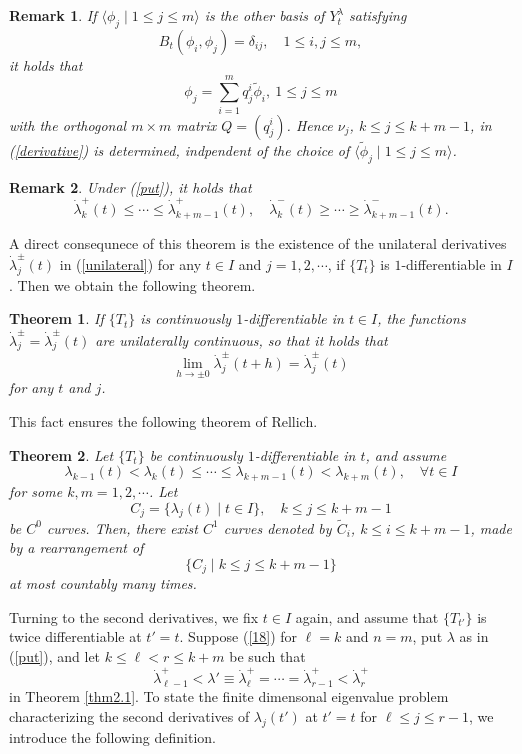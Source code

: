 \documentclass[final,a4paper]{jmsj}
\theoremstyle{thmstyleone}%
\newtheorem{theorem}{Theorem}
\theoremstyle{thmstyletwo}%
\newtheorem{remark}{Remark}%
\theoremstyle{thmstylethree}%
\begin{document}
\begin{remark}\label{orthgonalt}
If $\langle \phi_j \mid 1\leq j\leq m\rangle$ is the other basis of $Y^\lambda_t$ satisfying 
\begin{equation}  
B_t(\phi_i, \phi_j)=\delta_{ij}, \quad 1\leq i, j\leq m, 
 \label{xx1}
\end{equation} 
it holds that 
\[ \phi_j=\sum_{i=1}^mq^i_j\tilde \phi_i, \ 1\leq j\leq m \] 
with the orthogonal $m\times m$ matrix $Q=(q^i_j)$. Hence $\nu_j$, $k\leq j\leq k+m-1$, in (\ref{derivative}) is determined, indpendent of the choice of $\langle \tilde \phi_j \mid 1\leq j\leq m\rangle$.  
\end{remark} 

\begin{remark} 
Under (\ref{put}), it holds that 
\[ \dot \lambda_k^+(t)\leq \cdots \leq \dot \lambda_{k+m-1}^+(t), \quad \dot \lambda_k^-(t)\geq \cdots \geq \dot \lambda_{k+m-1}^-(t). \] 
\end{remark} 

A direct consequnece of this theorem is the existence of the unilateral derivatives 
$\dot\lambda_j^\pm(t)$ in (\ref{unilateral}) for any $t\in I$ and $j=1,2,\cdots$, if $\{ T_t\}$ is $1$-differentiable in $I$. Then we obtain the following theorem. 

\begin{theorem}\label{thm2+}
If $\{ T_t\}$ is continuously $1$-differentiable in $t\in I$, the functions $\dot\lambda^\pm_j=\dot\lambda^\pm_j(t)$ are unilaterally continuous, so that it holds that 
\[ \lim_{h\rightarrow \pm 0}\dot \lambda_j^\pm(t+h)=\dot \lambda_j^\pm(t) \] 
for any $t$ and $j$.  
\end{theorem} 

This fact ensures the following theorem of Rellich. 

\begin{theorem}\label{rellich+} 
Let $\{ T_t\}$ be continuously $1$-differentiable in $t$, and assume 
\[ \lambda_{k-1}(t)<\lambda_k(t)\leq \cdots \leq \lambda_{k+m-1}(t)<\lambda_{k+m}(t), \quad \forall t\in I  \] 
for some $k,m=1,2,\cdots$. Let 
\[ C_j=\{ \lambda_j(t) \mid t\in I\}, \quad k\leq j\leq k+m-1 \] 
be $C^0$ curves. Then, there exist $C^1$ curves denoted by $\tilde C_i$, $k\leq i\leq k+m-1$, made by a rearrangement of 
\[ \{ C_j\mid k\leq j\leq k+m-1\} \] 
at most countably many times.  
\end{theorem} 

Turning to the second derivatives, we fix $t\in I$ again, and assume that $\{ T_{t'}\}$ is twice differentiable at $t'=t$. Suppose (\ref{18}) for $\ell=k$ and $n=m$, put $\lambda$ as in (\ref{put}), and let $k\leq \ell <r\leq k+m$ be such that 
\begin{equation} 
\dot\lambda^+_{\ell-1}<\lambda'\equiv \dot \lambda^+_\ell=\cdots =\dot \lambda^+_{r-1}<\dot \lambda^+_r   
 \label{eq15+}
\end{equation} 
in Theorem \ref{thm2.1}. To state the finite dimensonal eigenvalue problem characterizing the second derivatives of $\lambda_j(t')$ at $t'=t$ for $\ell \leq j\leq r-1$, we introduce the following definition. 
\end{document}

